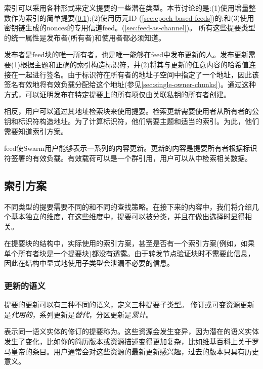 索引可以采用各种形式来定义提要的一些潜在类型。本节讨论的是:(1)使用增量整数作为索引的简单提要(\ref{sec:indexing-schemes});(2)使用历元ID (\ref{sec:epoch-based-feeds})的;和(3)使用密钥链生成的nonces的专用信道feed。(\ref{sec:feed-as-channel})。
所有这些提要类型的统一属性是发布者(所有者)和使用者都必须知道。 

发布者是feed块的唯一所有者，也是唯一能够在feed中发布更新的人。发布更新需要(1)根据主题和正确的索引构造标识符，并(2)将其与更新的任意内容的哈希值连接在一起进行签名。由于标识符在所有者的地址子空间中指定了一个地址，因此该签名有效地将有效负载分配给这个地址(参见\ref{sec:single-owner-chunks})。通过这种方式，可以证明发布在特定提要上的所有项仅由关联私钥的所有者创建。

相反，用户可以通过其地址检索块来使用提要。检索更新需要使用者从所有者的公钥和标识符构造地址。为了计算标识符，他们需要主题和适当的索引。为此，他们需要知道索引方案。 

feed使Swarm用户能够表示一系列的内容更新。更新的内容是提要所有者根据标识符签署的有效负载。有效载荷可以是一个群引用，用户可以从中检索相关数据。

\subsection{索引方案\statusyellow}\label{sec:indexing-schemes}

不同类型的提要需要不同的和不同的查找策略。在接下来的内容中，我们将介绍几个基本独立的维度，在这些维度中，提要可以被分类，并且在做出选择时显得相关。


在提要块的结构中，实际使用的索引方案，甚至是否有一个索引方案(例如，如果单个所有者块是一个提要块)都没有透露。由于转发节点验证块时不需要此信息，因此在结构中显式地使用子类型会泄漏不必要的信息。 

\subsubsection{更新的语义}

提要的更新可以有三种不同的语义，定义三种提要子类型。 
修订或可变资源更新是\emph{代用的}，系列更新是\emph{替代}，分区更新是\emph{累计}。 

表示同一语义实体的修订的提要称为。这些资源会发生变异，因为潜在的语义实体发生了变化，比如你的简历版本或资源描述变得更加复杂，比如维基百科上关于罗马皇帝的条目。用户通常会对这些资源的最新更新感兴趣，过去的版本只具有历史意义。 

